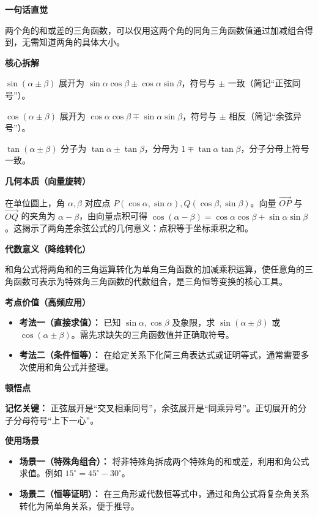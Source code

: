 \begin{explanationbox}

	\textbf{\textcolor{CExplanation}{一句话直觉}}

	两个角的和或差的三角函数，可以仅用这两个角的同角三角函数值通过加减组合得到，无需知道两角的具体大小。

	\medskip
	\textbf{\textcolor{CExplanation}{核心拆解}}
	\begin{description}[style=nextline, leftmargin=2.8em, labelsep=0.5em, itemsep=0.45em]
		\item[\textbf{要点一（正弦规律）：}] $\sin(\alpha\pm\beta)$ 展开为 $\sin\alpha\cos\beta\pm\cos\alpha\sin\beta$，符号与 $\pm$ 一致（简记“正弦同号”）。
		\item[\textbf{要点二（余弦规律）：}] $\cos(\alpha\pm\beta)$ 展开为 $\cos\alpha\cos\beta\mp\sin\alpha\sin\beta$，符号与 $\pm$ 相反（简记“余弦异号”）。
		\item[\textbf{要点三（正切结构）：}] $\tan(\alpha\pm\beta)$ 分子为 $\tan\alpha\pm\tan\beta$，分母为 $1\mp\tan\alpha\tan\beta$，分子分母上符号一致。
	\end{description}

	\medskip
	\textbf{\textcolor{CExplanation}{几何本质（向量旋转）}}

	在单位圆上，角 $\alpha,\beta$ 对应点 $P(\cos\alpha,\sin\alpha),Q(\cos\beta,\sin\beta)$。向量 $\overrightarrow{OP}$ 与 $\overrightarrow{OQ}$ 的夹角为 $\alpha-\beta$，由向量点积可得 $\cos(\alpha-\beta)=\cos\alpha\cos\beta+\sin\alpha\sin\beta$。这揭示了两角差余弦公式的几何意义：点积等于坐标乘积之和。

	\medskip
	\textbf{\textcolor{CExplanation}{代数意义（降维转化）}}

	和角公式将两角和的三角运算转化为单角三角函数的加减乘积运算，使任意角的三角函数可表示为特殊角三角函数的代数组合，是三角恒等变换的核心工具。

	\medskip
	\textbf{\textcolor{CExplanation}{考点价值（高频应用）}}
	\begin{itemize}[leftmargin=*, itemsep=0.5em, topsep=0.4em]
		\item \textbf{考法一（直接求值）：} 已知 $\sin\alpha,\cos\beta$ 及象限，求 $\sin(\alpha\pm\beta)$ 或 $\cos(\alpha\pm\beta)$。需先求缺失的三角函数值并正确取符号。
		\item \textbf{考法二（条件恒等）：} 在给定关系下化简三角表达式或证明等式，通常需要多次使用和角公式并整理。
	\end{itemize}

	\medskip
	\textbf{\textcolor{CExplanation}{顿悟点}}

	\textbf{记忆关键：} 正弦展开是“交叉相乘同号”，余弦展开是“同乘异号”。正切展开的分子分母符号“上下一心”。

	\medskip
	\textbf{\textcolor{CExplanation}{使用场景}}
	\begin{itemize}[leftmargin=*, itemsep=0.5em, topsep=0.4em]
		\item \textbf{场景一（特殊角组合）：} 将非特殊角拆成两个特殊角的和或差，利用和角公式求值。例如 $15^\circ=45^\circ-30^\circ$。
		\item \textbf{场景二（恒等证明）：} 在三角形或代数恒等式中，通过和角公式将复杂角关系转化为简单角关系，便于推导。
	\end{itemize}
\end{explanationbox}
